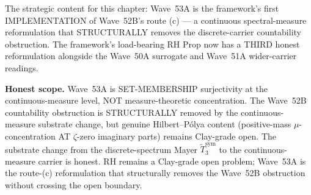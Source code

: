 \begin{remark}
\begin{itemize}
\end{itemize}
The strategic content for this chapter: Wave~53A is the framework's first IMPLEMENTATION of Wave~52B's route (c) --- a continuous spectral-measure reformulation that STRUCTURALLY removes the discrete-carrier countability obstruction. The framework's load-bearing RH Prop now has a THIRD honest reformulation alongside the Wave~50A surrogate and Wave~51A wider-carrier readings.

\textbf{Honest scope.} Wave~53A is SET-MEMBERSHIP surjectivity at the continuous-measure level, NOT measure-theoretic concentration. The Wave~52B countability obstruction is STRUCTURALLY removed by the continuous-measure substrate change, but genuine Hilbert--P\'olya content (positive-mass $\mu$-concentration AT $\zeta$-zero imaginary parts) remains Clay-grade open. The substrate change from the discrete-spectrum Mayer $\widetilde{T}_3^{\mathrm{sym}}$ to the continuous-measure carrier is honest. RH remains a Clay-grade open problem; Wave~53A is the route-(c) reformulation that structurally removes the Wave~52B obstruction without crossing the open boundary.
\end{remark}

